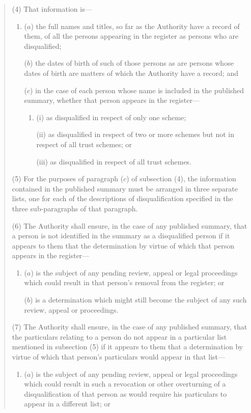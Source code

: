 \documentclass[12pt,a4paper]{article}
\begin{document}
\begin{quotation}
(4) That information is—
\begin{enumerate}\item[]
($a$) the full names and titles, so far as the Authority have a record of them, of all the persons appearing in the register as persons who are disqualified;

($b$) the dates of birth of such of those persons as are persons whose dates of birth are matters of which the Authority have a record; and

($c$) in the case of each person whose name is included in the published summary, whether that person appears in the register—
\begin{enumerate}\item[]
(i) as disqualified in respect of only one scheme;

(ii) as disqualified in respect of two or more schemes but not in respect of all trust schemes; or

(iii) as disqualified in respect of all trust schemes.
\end{enumerate}
\end{enumerate}

(5) For the purposes of paragraph ($c$)  of subsection (4), the information contained in the published summary must be arranged in three separate lists, one for each of the descriptions of disqualification specified in the three sub-paragraphs of that paragraph.

(6) The Authority shall ensure, in the case of any published summary, that a person is not identified in the summary as a disqualified person if it appears to them that the determination by virtue of which that person appears in the register—
\begin{enumerate}\item[]
($a$) is the subject of any pending review, appeal or legal proceedings which could result in that person’s removal from the register; or

($b$) is a determination which might still become the subject of any such review, appeal or proceedings.
\end{enumerate}

(7) The Authority shall ensure, in the case of any published summary, that the particulars relating to a person do not appear in a particular list mentioned in subsection (5)  if it appears to them that a determination by virtue of which that person’s particulars would appear in that list—
\begin{enumerate}\item[]
($a$) is the subject of any pending review, appeal or legal proceedings which could result in such a revocation or other overturning of a disqualification of that person as would require his particulars to appear in a different list; or


\end{enumerate}
\end{quotation}
\end{document}
